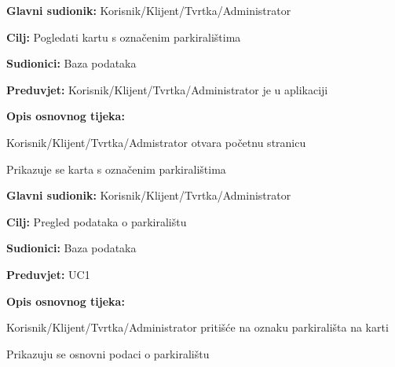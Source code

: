\noindent {}
\begin{packed_item}
	
	\item \textbf{Glavni sudionik: } Korisnik/Klijent/Tvrtka/Administrator
	\item \textbf{Cilj:} Pogledati kartu s označenim parkiralištima
	\item \textbf{Sudionici:} Baza podataka
	\item \textbf{Preduvjet:} Korisnik/Klijent/Tvrtka/Administrator je u aplikaciji
	\item \textbf{Opis osnovnog tijeka:}
	
	\item[] \begin{packed_enum}
		
		\item Korisnik/Klijent/Tvrtka/Admistrator otvara početnu stranicu
		\item Prikazuje se karta s označenim parkiralištima

	\end{packed_enum}
	
\end{packed_item}

\noindent {}
\begin{packed_item}
	
	\item \textbf{Glavni sudionik:} Korisnik/Klijent/Tvrtka/Administrator
	\item \textbf{Cilj:} Pregled podataka o parkiralištu
	\item \textbf{Sudionici:} Baza podataka
	\item \textbf{Preduvjet:} UC1
	\item \textbf{Opis osnovnog tijeka:}
	
	\item[] \begin{packed_enum}
		
		\item Korisnik/Klijent/Tvrtka/Administrator pritišće na oznaku parkirališta na karti
		\item Prikazuju se osnovni podaci o parkiralištu

	\end{packed_enum}
\end{packed_item}

\pagebreak

